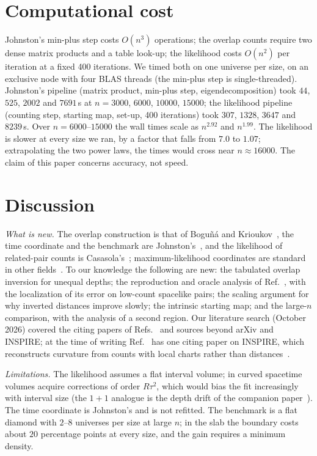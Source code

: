 \documentclass[prd,twocolumn,superscriptaddress,nofootinbib,amsmath,amssymb,floatfix]{revtex4-2}
\begin{document}
\section{Computational cost}\label{sec:cost}
Johnston's min-plus step costs $O(n^3)$ operations; the overlap counts require two dense matrix products and a table look-up; the likelihood costs $O(n^2)$ per iteration at a fixed 400 iterations. We timed both on one universe per size, on an exclusive node with four BLAS threads (the min-plus step is single-threaded). Johnston's pipeline (matrix product, min-plus step, eigendecomposition) took $44$, $525$, $2002$ and $7691$\,s at $n=3000$, $6000$, $10000$, $15000$; the likelihood pipeline (counting step, starting map, set-up, 400 iterations) took $307$, $1328$, $3647$ and $8239$\,s. Over $n=6000$--$15000$ the wall times scale as $n^{2.92}$ and $n^{1.99}$. The likelihood is slower at every size we ran, by a factor that falls from $7.0$ to $1.07$; extrapolating the two power laws, the times would cross near $n\approx16000$. The claim of this paper concerns accuracy, not speed.

\section{Discussion}\label{sec:disc}
\emph{What is new.} The overlap construction is that of Bogu\~n\'a and Krioukov~\cite{BK24}, the time coordinate and the benchmark are Johnston's~\cite{Johnston25}, and the likelihood of related-pair counts is Casasola's~\cite{Casasola26}; maximum-likelihood coordinates are standard in other fields~\cite{Ramsay77,Hoff02,BPK10,Mercator19,Sim21}. To our knowledge the following are new: the tabulated overlap inversion for unequal depths; the reproduction and oracle analysis of Ref.~\cite{Johnston25}, with the localization of its error on low-count spacelike pairs; the scaling argument for why inverted distances improve slowly; the intrinsic starting map; and the large-$n$ comparison, with the analysis of a second region. Our literature search (October 2026) covered the citing papers of Refs.~\cite{BK24,Johnston25,CloughEvans16,Casasola26} and sources beyond arXiv and INSPIRE; at the time of writing Ref.~\cite{Johnston25} has one citing paper on INSPIRE, which reconstructs curvature from counts with local charts rather than distances~\cite{Madsen26}.

\emph{Limitations.} The likelihood assumes a flat interval volume; in curved spacetime volumes acquire corrections of order $R\tau^2$, which would bias the fit increasingly with interval size (the $1+1$ analogue is the depth drift of the companion paper~\cite{Toolkit}). The time coordinate is Johnston's and is not refitted. The benchmark is a flat diamond with $2$--$8$ universes per size at large $n$; in the slab the boundary costs about $20$ percentage points at every size, and the gain requires a minimum density.
\end{document}
